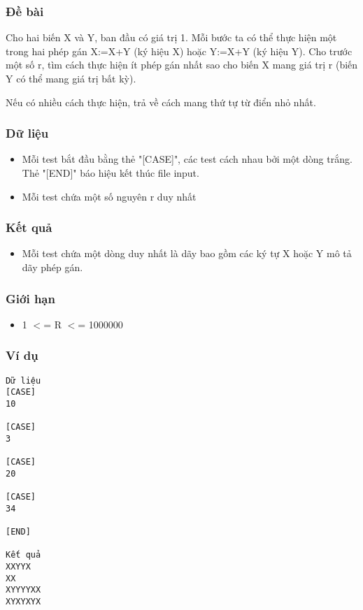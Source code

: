 



\subsubsection{   Đề bài  }

   Cho hai biến X và Y, ban đầu có giá trị 1. Mỗi bước ta có thể thực hiện một trong hai phép gán X:=X+Y (ký hiệu X) hoặc Y:=X+Y (ký hiệu Y). Cho trước một số r, tìm cách thực hiện ít phép gán nhất sao cho biến X mang giá trị r (biến Y có thể mang giá trị bất kỳ).  

   Nếu có nhiều cách thực hiện, trả về cách mang thứ tự từ điển nhỏ nhất.  

\subsubsection{   Dữ liệu  }
\begin{itemize}
	\item     Mỗi test bắt đầu bằng thẻ "[CASE]", các test cách nhau bởi một dòng trắng. Thẻ "[END]" báo hiệu kết thúc file input.   
	\item     Mỗi test chứa một số nguyên r duy nhất   
\end{itemize}

\subsubsection{   Kết quả  }
\begin{itemize}
	\item     Mỗi test chứa một dòng duy nhất là dãy bao gồm các ký tự X hoặc Y mô tả dãy phép gán.   
\end{itemize}

\subsubsection{   Giới hạn  }
\begin{itemize}
	\item     1 $<$= R $<$= 1000000   
\end{itemize}

\subsubsection{   Ví dụ  }
\begin{verbatim}
Dữ liệu
[CASE]
10

[CASE]
3

[CASE]
20

[CASE]
34

[END]

Kết quả
XXYYX
XX
XYYYYXX
XYXYXYX
\end{verbatim}